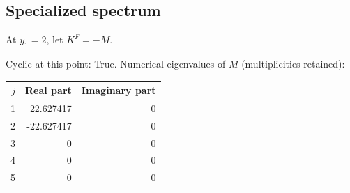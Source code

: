 \documentclass[10pt,a4paper]{article}
\newcommand{\fitmath}[1]{\sbox{\mathbox}{$\displaystyle #1$}\ifdim\wd\mathbox>\linewidth\resizebox{\linewidth}{!}{\usebox{\mathbox}}\else\usebox{\mathbox}\fi}
\begin{document}
\subsection*{Specialized spectrum}
At $y_1=2$, let $K^F=-M$.
\begin{center}\fitmath{\Delta=1024}\end{center}
Cyclic at this point: True.
Numerical eigenvalues of $M$ (multiplicities retained):
\begin{center}\small\begin{tabular}{rrr}\toprule $j$ & Real part & Imaginary part\\\midrule
1 & 22.627417 & 0\\
2 & -22.627417 & 0\\
3 & 0 & 0\\
4 & 0 & 0\\
5 & 0 & 0\\
\bottomrule\end{tabular}\end{center}
\end{document}

